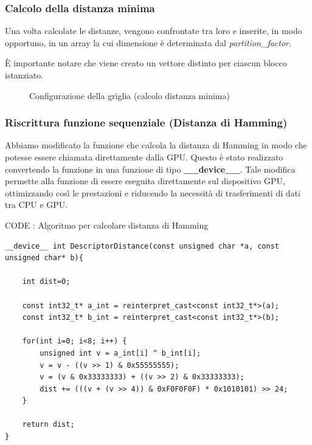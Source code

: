 \documentclass[12pt,a4paper]{report}
\begin{document}
\subsubsection{Calcolo della distanza minima}

Una volta calcolate le distanze, vengono confrontate tra loro e inserite, in modo opportuno, in un array la cui dimensione è determinata dal \textit{partition\_factor}. 

È importante notare che viene creato un vettore distinto per ciascun blocco istanziato. 

\begin{figure}[H]
    \centering
    \caption{Configurazione della griglia (calcolo distanza minima) }
\end{figure}

\newpage
\subsubsection{Riscrittura funzione sequenziale (Distanza di Hamming) }

Abbiamo modificato la funzione che calcola la distanza di Hamming in modo che potesse essere chiamata direttamente dalla GPU. Questo è stato realizzato convertendo la funzione in una funzione di tipo \textbf{\_\_device\_\_}. Tale modifica permette alla funzione di essere eseguita direttamente sul dispositivo GPU, ottimizzando così le prestazioni e riducendo la necessità di trasferimenti di dati tra CPU e GPU.

\vspace{1cm}

CODE : Algoritmo per calcolare distanza di Hamming
\begin{lstlisting}
__device__ int DescriptorDistance(const unsigned char *a, const unsigned char* b){

    int dist=0;

    const int32_t* a_int = reinterpret_cast<const int32_t*>(a);
    const int32_t* b_int = reinterpret_cast<const int32_t*>(b);

    for(int i=0; i<8; i++) {
        unsigned int v = a_int[i] ^ b_int[i];
        v = v - ((v >> 1) & 0x55555555);
        v = (v & 0x33333333) + ((v >> 2) & 0x33333333);
        dist += (((v + (v >> 4)) & 0xF0F0F0F) * 0x1010101) >> 24;
    }

    return dist;
}
\end{lstlisting}
\end{document}

